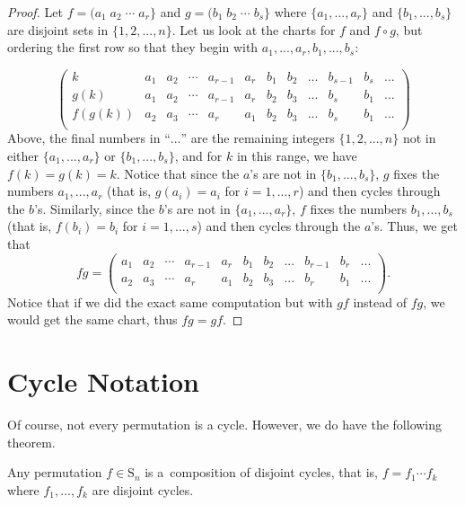 \documentclass[11pt,dvipsnames]{book}
\numberwithin{figure}{section} %
\numberwithin{table}{section} %
\begin{document}
\begin{proof}
Let $f=(a_{1}\; a_{2}\; \cdots \; a_{r}\}$ and $g=(b_{1}\; b_{2}\; \cdots \; b_{s}\}$ where $\{a_{1},...,a_{r}\}$ and $\{b_{1},...,b_{s}\}$ are disjoint sets in $\{1,2,...,n\}$. Let us look at the charts for $f$ and $f\circ g$, but ordering the first row so that they begin with $a_{1},...,a_{r},b_{1},...,b_{s}$:

\[
 \left(\begin{array}{c|ccccccccccc} %
k & a_1 & a_2 & \cdots  &  a_{r-1} &  a_r & b_{1} & b_{2} & ...  & b_{s-1} &  b_{s} & ... \\  %
g(k) & a_1 & a_2 & \cdots  &  a_{r-1} &  a_r & b_{2} & b_{3} & ...  & b_{s} &  b_{1} & ... \\  %
f(g(k)) & a_2 & a_3 & \cdots  &  a_{r} &  a_1 & b_{2} & b_{3} & ...  & b_{s} &  b_{1} & ... \\  %
\end{array}\right)
\]
Above, the final numbers in ``$...$'' are the remaining integers $\{1,2,...,n\}$ not in either $\{a_{1},...,a_{r}\}$ or $\{b_{1},...,b_{s}\}$, and for $k$ in this range, we have $f(k)=g(k)=k$. Notice that since the $a$'s are not in  $\{b_{1},...,b_{s}\}$, $g$ fixes the numbers $a_{1},...,a_{r}$ (that is, $g(a_{i})=a_{i}$ for $i=1,...,r$) and then cycles through the $b$'s. Similarly,  since the $b$'s are not in  $\{a_{1},...,a_{r}\}$, $f$ fixes the numbers $b_{1},...,b_{s}$ (that is, $f(b_{i})=b_{i}$ for $i=1,...,s$) and then cycles through the $a$'s. Thus, we get that
\[
fg=  \left(\begin{array}{c|cccccccccc} %
 a_1 & a_2 & \cdots  &  a_{r-1} &  a_r & b_{1} & b_{2} & ...  & b_{r-1} &  b_{r} & ... \\  %
 a_2 & a_3 & \cdots  &  a_{r} &  a_1 & b_{2} & b_{3} & ...  & b_{r} &  b_{1} & ... \\  %
\end{array}\right).
\]
Notice that if we did the exact same computation but with $gf$ instead of $fg$, we would get the same chart, thus $fg=gf$. 

\end{proof}


\section{Cycle Notation}%
\label{cyclenotation}
Of course, not every permutation is a cycle. However, we do have the following theorem.

\begin{theorem}%
Any permutation $f\in \mathrm{S}_{n}$ is a~composition of disjoint
cycles, that is, $f=f_{1}\cdots f_{k}$ where $f_{1},...,f_{k}$ are disjoint cycles.
\end{theorem}
\end{document}
